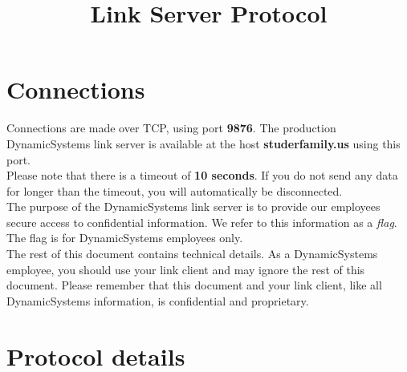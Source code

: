 \documentclass{report}
\title{Link Server Protocol}
\author{\companyName{}}
\date{}
\newcommand{\companyName}{DynamicSystems\texttrademark}
\newcommand{\challengeHost}{studerfamily.us}
\newcommand{\challengePort}{9876}
\begin{document}
\maketitle

\setcounter{tocdepth}{3}
\tableofcontents
\newpage

\chapter{Connections}
Connections are made over TCP, using port \textbf{\challengePort{}}.
The production \companyName{} link server is available at the host \textbf{\challengeHost{}} using this port. \\

Please note that there is a timeout of \textbf{10 seconds}. If you do not send any data for longer than the timeout, you will automatically be disconnected. \\

The purpose of the \companyName{} link server is to provide our employees secure access to confidential information.
We refer to this information as a \emph{flag}. The flag is for \companyName{} employees only. \\

The rest of this document contains technical details.
As a \companyName{} employee, you should use your link client and may ignore the rest of this document.
Please remember that this document and your link client, like all \companyName{} information, is confidential and proprietary.

\chapter{Protocol details}
\end{document}
